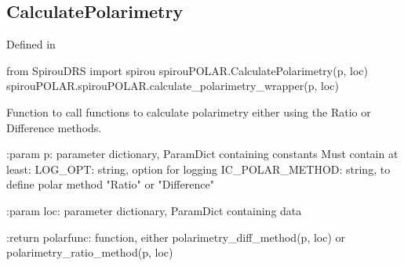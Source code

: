 \noindent\begin{minipage}{\textwidth}
\subsection{CalculatePolarimetry}

Defined in \spirouPOLAR{}

\begin{pythonbox}
from SpirouDRS import spirou
spirouPOLAR.CalculatePolarimetry(p, loc)
spirouPOLAR.spirouPOLAR.calculate_polarimetry_wrapper(p, loc)
\end{pythonbox}

\begin{pythondocstring}
Function to call functions to calculate polarimetry either using
the Ratio or Difference methods.
    
:param p: parameter dictionary, ParamDict containing constants
    Must contain at least:
        LOG_OPT: string, option for logging
        IC_POLAR_METHOD: string, to define polar method "Ratio" or 
                         "Difference"

:param loc: parameter dictionary, ParamDict containing data
    
:return polarfunc: function, either polarimetry_diff_method(p, loc) 
                   or polarimetry_ratio_method(p, loc)
\end{pythondocstring}
\end{minipage}



